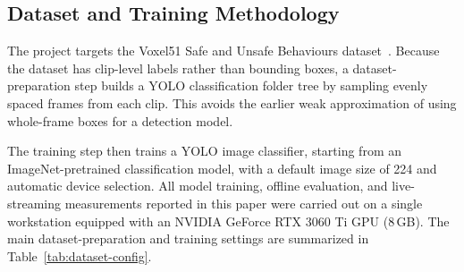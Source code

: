 \documentclass[conference]{IEEEtran}
\begin{document}
\subsection{Dataset and Training Methodology}

The project targets the Voxel51 Safe and Unsafe Behaviours dataset~\cite{b6}.
Because the dataset has
clip-level labels rather than bounding boxes, a dataset-preparation step builds
a YOLO classification folder tree by sampling evenly spaced frames from each
clip. This avoids the earlier weak approximation of using whole-frame boxes for
a detection model.

The training step then trains a YOLO image classifier, starting from an
ImageNet-pretrained classification model, with a default image size of 224 and
automatic device selection. All model training, offline evaluation, and
live-streaming measurements reported in this paper were carried out on a single
workstation equipped with an NVIDIA GeForce RTX 3060 Ti GPU (8\,GB). The main
dataset-preparation and training settings are summarized in
Table~\ref{tab:dataset-config}.
\end{document}
